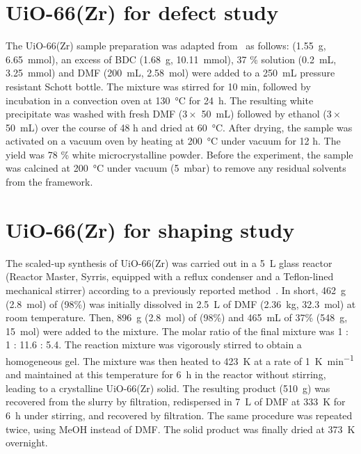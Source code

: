 \section{UiO-66(Zr) for defect study}%
\label{appx:synthesis:uio66def}

The UiO-66(Zr) sample preparation was adapted 
from~\citet{shearerTunedPerfectionIroning2014} as follows:
 (\SI{1.55}{\gram}, \SI{6.65}{\milli\mol}), an excess 
of \gls{BDC}
(\SI{1.68}{\gram}, \SI{10.11}{\milli\mol}),  37 \% solution 
(\SI{0.2}{\milli\liter}, \SI{3.25}{\milli\mol}) and \gls{DMF} 
(\SI{200}{\milli\liter}, \SI{2.58}{\mol}) were added to a 
\SI{250}{\milli\liter} pressure resistant Schott bottle. The mixture 
was stirred for 10 min, followed by incubation in a convection oven 
at \SI{130}{\celsius} for \SI{24}{\hour}. The resulting white 
precipitate was washed with fresh \gls{DMF} (\(3 \times \) \SI{50}{\milli\liter}) 
followed by ethanol (\(3 \times \) \SI{50}{\milli\liter})
over the course of 48 h and dried at \SI{60}{\celsius}. 
After drying, the sample was activated 
on a vacuum oven by heating at \SI{200}{\celsius} under vacuum for 12 h. 
The yield was 78 \% white microcrystalline powder. Before the 
experiment, the sample was calcined at \SI{200}{\celsius} under
vacuum (\SI{5}{\milli\bar}) to remove any residual solvents
from the framework.

\section{UiO-66(Zr) for shaping study}%
\label{appx:synthesis:uio66shaping}

The scaled-up synthesis of UiO-66(Zr) was carried out in 
a \SI{5}{\liter} glass reactor (Reactor Master, Syrris, equipped with 
a reflux condenser and a Teflon-lined mechanical stirrer)
according to a previously reported 
method~\cite{ragonSituEnergyDispersiveXray2014}.
In short, \SI{462}{\gram} (\SI{2.8}{\mol}) of  (98\%) was 
initially dissolved in \SI{2.5}{\liter} of \gls{DMF} 
(\SI{2.36}{\kilo\gram}, \SI{32.3}{\mol}) at room temperature. 
Then, \SI{896}{\gram} (\SI{2.8}{\mol}) of 
(98\%) and \SI{465}{\milli\liter} of 37\%  
(\SI{548}{\gram}, \SI{15}{\mol}) were added to the mixture. 
The molar ratio of the final  
mixture was 1 : 1 : 11.6 : 5.4. The reaction mixture was vigorously
stirred to obtain a homogeneous gel. The mixture was then heated
to \SI{423}{\kelvin} at a rate of \SI{1}{\kelvin\per\minute}
and maintained at this temperature for \SI{6}{\hour} in the
reactor without stirring, leading to a crystalline UiO-66(Zr) solid.
The resulting product (\SI{510}{\gram}) was recovered from the 
slurry by filtration, redispersed in \SI{7}{\liter} of \gls{DMF} at 
\SI{333}{\kelvin} for \SI{6}{\hour} under stirring, 
and recovered by filtration. 
The same procedure was repeated twice, using \gls{MeOH}
instead of \gls{DMF}. The solid product was finally dried at 
\SI{373}{\kelvin} overnight.

